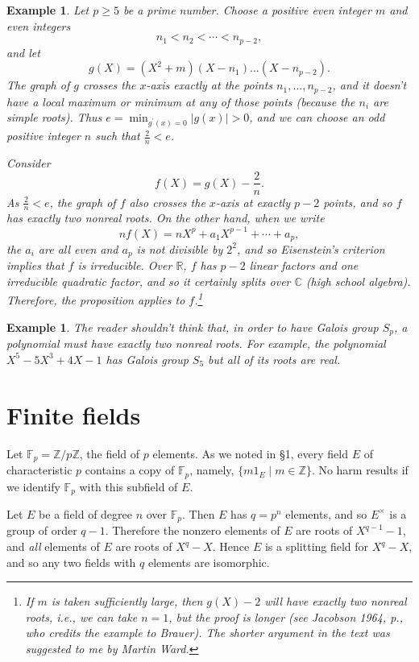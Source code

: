 \documentclass[a4paper,11pt,final,openany]{memoir}
\newtheorem{example}[X]{Example}
\theoremstyle{nonumberplain}
\begin{document}
\begin{example}
\label{cg14}Let $p$$\geq5$ be a prime number. Choose a positive even integer
$m$ and even integers
\[
n_{1}<n_{2}<\cdots<n_{p-2},
\]
and let
\[
g(X)=(X^{2}+m)(X-n_{1})...(X-n_{p-2}).
\]
The graph of $g$ crosses the $x$-axis exactly at the points $n_{1}%
,\ldots,n_{p-2}$, and it doesn't have a local maximum or minimum at any of
those points (because the $n_{i}$ are simple roots). Thus $e=\min_{g^{\prime
}(x)=0}|g(x)|>0$, and we can choose an odd positive integer $n$ such that
$\frac{2}{n}<e$.

Consider%
\[
f(X)=g(X)-\frac{2}{n}\text{.}%
\]
As $\frac{2}{n}<e$, the graph of $f$ also crosses the $x$-axis at exactly
$p-2$ points, and so $f$ has exactly two nonreal roots. On the other hand,
when we write%
\[
nf(X)=nX^{p}+a_{1}X^{p-1}+\cdots+a_{p},
\]
the $a_{i}$ are all even and $a_{p}$ is not divisible by $2^{2}$, and so
Eisenstein's criterion implies that $f$ is irreducible. Over $\mathbb{R}{}$,
$f$ has $p-2$ linear factors and one irreducible quadratic factor, and so it
certainly splits over $\mathbb{C}{}$ (high school algebra). Therefore, the
proposition applies to $f$.\footnote{If $m$ is taken sufficiently large, then
$g(X)-2$ will have exactly two nonreal roots, i.e., we can take $n=1$, but the
proof is longer (see Jacobson 1964, p., who credits the example
to Brauer). The shorter argument in the text was suggested to me by Martin
Ward.}
\end{example}

\begin{example}
\label{cg14a}The reader shouldn't think that, in order to have Galois group
$S_{p}$, a polynomial must have exactly two nonreal roots. For example, the
polynomial $X^{5}-5X^{3}+4X-1$ has Galois group $S_{5}$ but all of its roots
are real.
\end{example}

\section{Finite fields}

Let $\mathbb{F}_{p}=\mathbb{Z}/p\mathbb{Z}$, the field of $p$ elements. As we
noted in \S 1, every field $E$ of characteristic $p$ contains a copy of
$\mathbb{F}_{p}$, namely, $\{m1_{E}\mid m\in\mathbb{Z}\}$. No harm results if
we identify $\mathbb{F}_{p}$ with this subfield of $E$.

Let $E$ be a field of degree $n$ over $\mathbb{F}_{p}$. Then $E$ has $q=p^{n}$
elements, and so $E^{\times}$ is a group of order $q-1$. Therefore the nonzero
elements of $E$ are roots of $X^{q-1}-1$, and \textit{all} elements of $E$ are
roots of $X^{q}-X$. Hence $E$ is a splitting field for $X^{q}-X$, and so any
two fields with $q$ elements are isomorphic.
\end{document}
